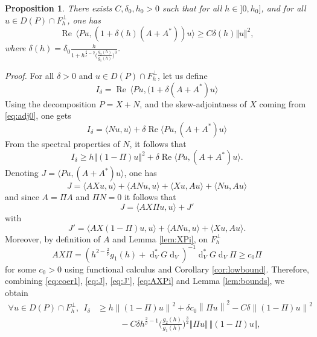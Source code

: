 \documentclass[12pt]{amsart}
\renewcommand{\Re}{\operatorname{Re}}
\def\<{\langle}
\def\>{\rangle}
\newcommand{\bp}{{\it Proof. }}
\renewcommand{\d}{\operatorname{d}}
\numberwithin{equation}{section}
\numberwithin{figure}{section}
\newcommand{\vvert}[1]{\left\lVert#1\right\rVert}
\newtheorem{proposition}[defin]{Proposition}
\begin{document}
\begin{proposition}\label{prop:hypocoer}
There exists $C,\delta_0,h_0>0$ such that for all $h\in]0,h_0]$, and for all $u\in D(P)\cap F_h^\bot$, one has
$$
\Re\,\<Pu,(1+\delta(h)(A+A^*))u\>\geq C\delta(h) \Vert u\Vert^2,
$$
where $\delta(h)=\delta_0 \frac{h}{1 + h^{\frac{4}{\overline\nu}-2}\Big(\frac{g_2(h)}{g_1(h)}\Big)^{3}}$.
\end{proposition}
\bp
For all $\delta>0$ and $u\in D(P)\cap F_h^\bot$, let us define 
\begin{equation*}
I_\delta = \Re\,\<P u,(1+\delta(A+A^*)u\>
\end{equation*}
Using the decomposition $P = X + N$, and the skew-adjointness of $X$ coming from \eqref{eq:adj0}, one gets
\begin{equation*}
I_\delta = \<N u,u\> + \delta\Re\<Pu,(A+A^*)u\>
\end{equation*}
From the spectral properties of $N$, it follows that
\begin{equation}\label{eq:coer1}
I_\delta \geq h\Vert (1-\Pi)u\Vert^2 + \delta\Re\<Pu,(A+A^*)u\>.
\end{equation}
Denoting $J = \<Pu,(A+A^*)u\>$, one has
\begin{equation*}
J = \<AXu,u\> + \<ANu,u\> + \<Xu,Au\> + \<Nu,Au\>
\end{equation*}
and since $A = \Pi A$ and $\Pi N = 0$ it follows that 
\begin{equation}\label{eq:J}
J = \<AX\Pi u,u\> + J'
\end{equation}
with 
\begin{equation}\label{eq:J'}
J' = \<AX(1-\Pi)u,u\> + \<ANu,u\> + \<Xu,Au\>.
\end{equation}
Moreover, by definition of $A$ and Lemma \ref{lem:XPi}, on $F_h^\bot$
\begin{equation}\label{eq:AXPi}
AX\Pi = (h^{2-\frac2{\overline{\nu}}}g_1(h) + \d_V^*G\d_V)^{-1}\d_V^*G\d_V\Pi \geq c_0\Pi
\end{equation}
for some $c_0>0$ using functional calculus and Corollary \ref{cor:lowbound}. Therefore, combining \eqref{eq:coer1}, \eqref{eq:J}, \eqref{eq:J'}, \eqref{eq:AXPi} and Lemma \ref{lem:bounds}, we obtain
\begin{equation*}
\begin{aligned}
    \forall u\in D(P)\cap F_h^\bot,\ \ I_\delta &\geq h\vvert{(1-\Pi)u}^2 + \delta c_0\vvert{\Pi u}^2 - C\delta\vvert{(1-\Pi)u}^2\\&\phantom{****} - C\delta h^{\frac{2}{\overline\nu}-1}\Big(\frac{g_2(h)}{g_1(h)}\Big)^{\frac32}\Vert \Pi u\Vert\, \Vert(1- \Pi) u\Vert,
\end{aligned}
\end{equation*}
\end{document}
